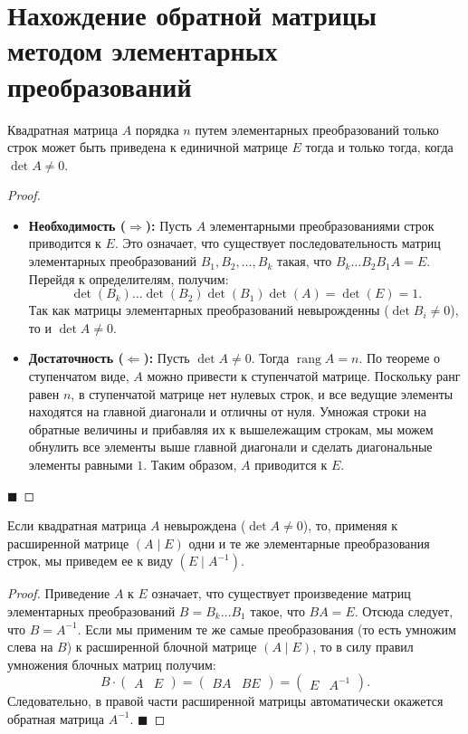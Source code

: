 \section{Нахождение обратной матрицы методом элементарных преобразований}

\begin{theorem}
Квадратная матрица $A$ порядка $n$ путем элементарных преобразований только строк может быть приведена к единичной матрице $E$ тогда и только тогда, когда $\det A \neq 0$.
\end{theorem}

\begin{proof}
\begin{itemize}
    \item \textbf{Необходимость ($\Rightarrow$):} Пусть $A$ элементарными преобразованиями строк приводится к $E$. Это означает, что существует последовательность матриц элементарных преобразований $B_1, B_2, \dots, B_k$ такая, что $B_k \dots B_2 B_1 A = E$. Перейдя к определителям, получим:
    $$
    \det(B_k) \dots \det(B_2) \det(B_1) \det(A) = \det(E) = 1.
    $$
    Так как матрицы элементарных преобразований невырожденны ($\det B_i \neq 0$), то и $\det A \neq 0$.
    \item \textbf{Достаточность ($\Leftarrow$):} Пусть $\det A \neq 0$. Тогда $\operatorname{rang} A = n$. По теореме о ступенчатом виде, $A$ можно привести к ступенчатой матрице. Поскольку ранг равен $n$, в ступенчатой матрице нет нулевых строк, и все ведущие элементы находятся на главной диагонали и отличны от нуля. Умножая строки на обратные величины и прибавляя их к вышележащим строкам, мы можем обнулить все элементы выше главной диагонали и сделать диагональные элементы равными $1$. Таким образом, $A$ приводится к $E$.
\end{itemize}
\hfill$\blacksquare$
\end{proof}

\begin{theorem}
Если квадратная матрица $A$ невырождена ($\det A \neq 0$), то, применяя к расширенной матрице $(A \mid E)$ одни и те же элементарные преобразования строк, мы приведем ее к виду $(E \mid A^{-1})$.
\end{theorem}

\begin{proof}
Приведение $A$ к $E$ означает, что существует произведение матриц элементарных преобразований $B = B_k \dots B_1$ такое, что $BA = E$. Отсюда следует, что $B = A^{-1}$.
Если мы применим те же самые преобразования (то есть умножим слева на $B$) к расширенной блочной матрице $(A \mid E)$, то в силу правил умножения блочных матриц получим:
$$
B \cdot \left( \begin{array}{c|c} A & E \end{array} \right) = \left( \begin{array}{c|c} BA & BE \end{array} \right) = \left( \begin{array}{c|c} E & A^{-1} \end{array} \right).
$$
Следовательно, в правой части расширенной матрицы автоматически окажется обратная матрица $A^{-1}$.
\hfill$\blacksquare$
\end{proof}

